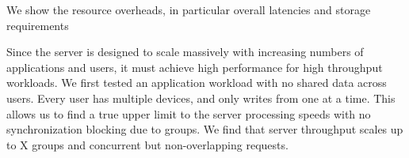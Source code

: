 We show the resource overheads, in particular overall latencies and storage requirements


Since the server is designed to scale massively with increasing numbers of applications and users, it must achieve high performance for high throughput workloads. We first tested an application workload with no shared data across users. Every user has multiple devices, and only writes from one at a time. This allows us to find a true upper limit to the server processing speeds with no synchronization blocking due to groups. We find that server throughput scales up to X groups and concurrent but non-overlapping requests.


